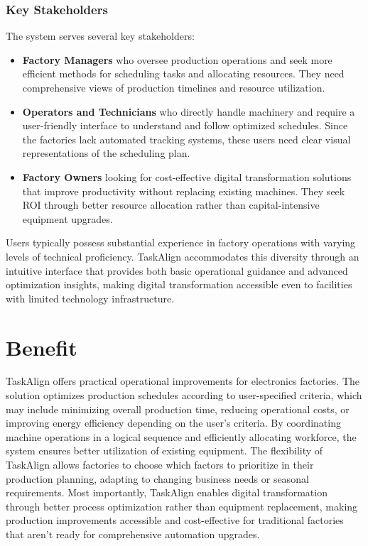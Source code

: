 \subsubsection{Key Stakeholders}
The system serves several key stakeholders:
\begin{itemize}
    \item \textbf{Factory Managers} who oversee production operations and seek more efficient methods for scheduling tasks and allocating resources. They need comprehensive views of production timelines and resource utilization.
    \item \textbf{Operators and Technicians} who directly handle machinery and require a user-friendly interface to understand and follow optimized schedules. Since the factories lack automated tracking systems, these users need clear visual representations of the scheduling plan.
    \item \textbf{Factory Owners} looking for cost-effective digital transformation solutions that improve productivity without replacing existing machines. They seek ROI through better resource allocation rather than capital-intensive equipment upgrades.
\end{itemize}

Users typically possess substantial experience in factory operations with varying levels of technical proficiency. TaskAlign accommodates this diversity through an intuitive interface that provides both basic operational guidance and advanced optimization insights, making digital transformation accessible even to facilities with limited technology infrastructure.

\section{Benefit}
\label{section:benefit}

TaskAlign offers practical operational improvements for electronics factories. The solution optimizes production schedules according to user-specified criteria, which may include minimizing overall production time, reducing operational costs, or improving energy efficiency depending on the user's criteria. By coordinating machine operations in a logical sequence and efficiently allocating workforce, the system ensures better utilization of existing equipment.
The flexibility of TaskAlign allows factories to choose which factors to prioritize in their production planning, adapting to changing business needs or seasonal requirements. 
Most importantly, TaskAlign enables digital transformation through better process optimization rather than equipment replacement, making production improvements accessible and cost-effective for traditional factories that aren't ready for comprehensive automation upgrades.


